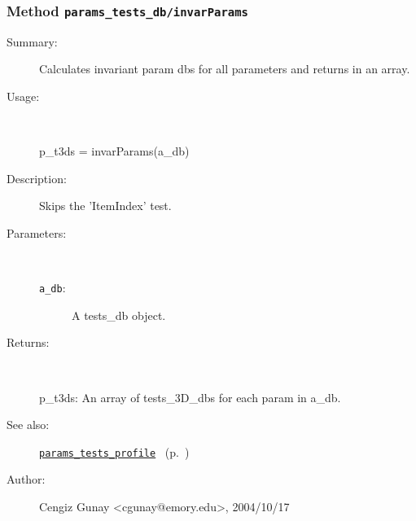 \subsubsection[Method \texttt{invarParams}]{Method \texttt{params\_tests\_db/invarParams}}%
%
\label{ref_params_tests_db__invarParams}%
\hypertarget{ref_params_tests_db__invarParams}{}%
\begin{description}
\item[Summary:]Calculates invariant param dbs for all parameters and returns in an array.
%
\item[Usage:]~%
\begin{lyxcode}%
p\_t3ds = invarParams(a\_db)
%
\end{lyxcode}%
%
\item[Description:]%
Skips the 'ItemIndex' test.
\item[Parameters:]~
\begin{description}%
\item[\texttt{a\_db}:]
 A tests\_db object.
\end{description}%
%
\item[Returns:
]~

	p\_t3ds: An array of tests\_3D\_dbs for each param in a\_db.
%
%
\item[See also:]%
\hyperlink{ref_params_tests_profile}{\texttt{params\_tests\_profile}}%
\ (p.~\pageref{ref_params_tests_profile})%
%
%
\item[Author:]%
Cengiz Gunay <cgunay@emory.edu>, 2004/10/17
%
\end{description}
\methodline%
